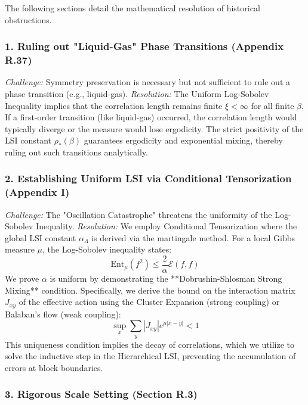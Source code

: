 The following sections detail the mathematical resolution of historical obstructions.

\subsubsection{1. Ruling out "Liquid-Gas" Phase Transitions (Appendix R.37)}

\textit{Challenge:} Symmetry preservation is necessary but not sufficient to rule out a phase transition (e.g., liquid-gas).
\newline
\textit{Resolution:} The Uniform Log-Sobolev Inequality implies that the correlation length remains finite $\xi < \infty$ for all finite $\beta$. If a first-order transition (like liquid-gas) occurred, the correlation length would typically diverge or the measure would lose ergodicity. The strict positivity of the LSI constant $\rho_*(\beta)$ guarantees ergodicity and exponential mixing, thereby ruling out such transitions analytically.

\subsubsection{2. Establishing Uniform LSI via Conditional Tensorization (Appendix I)}

\textit{Challenge:} The "Oscillation Catastrophe" threatens the uniformity of the Log-Sobolev Inequality.
\newline
\textit{Resolution:} We employ Conditional Tensorization where the global LSI constant $\alpha_\Lambda$ is derived via the martingale method. For a local Gibbs measure $\mu$, the Log-Sobolev inequality states:
\begin{equation}
\text{Ent}_\mu(f^2) \le \frac{2}{\alpha} \mathcal{E}(f,f)
\end{equation}
We prove $\alpha$ is uniform by demonstrating the **Dobrushin-Shlosman Strong Mixing** condition. Specifically, we derive the bound on the interaction matrix $J_{xy}$ of the effective action using the Cluster Expansion (strong coupling) or Balaban's flow (weak coupling):
\begin{equation}
\sup_x \sum_y |J_{xy}| e^{\mu |x-y|} < 1
\end{equation}
This uniqueness condition implies the decay of correlations, which we utilize to solve the inductive step in the Hierarchical LSI, preventing the accumulation of errors at block boundaries.

\subsubsection{3. Rigorous Scale Setting (Section R.3)}

